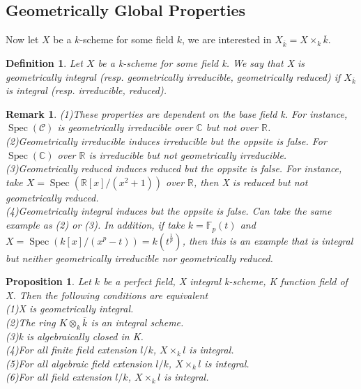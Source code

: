 \documentclass{ctexart}
\newtheorem{definition}{Definition}[section]
\newtheorem{remark}{Remark}[section]
\newtheorem{proposition}{Proposition}[section]
\newcommand{\spec}{\operatorname{Spec}}
\begin{document}
\subsection{Geometrically Global Properties}
Now let $X$ be a $k$-scheme for some field $k$, we are interested in $X_{\overline{k}} = X \times_{k} \overline{k}$.
\begin{definition}
    Let $X$ be a k-scheme for some field k.
    We say that X is geometrically integral (resp. geometrically irreducible, geometrically reduced) if $X_{\overline{k}}$ is integral (resp. irreducible, reduced).
\end{definition}
\begin{remark}
    (1)These properties are dependent on the base field k.
    For instance, $\spec(\mathcal{C})$ is geometrically irreducible over $\mathbb{C}$ but not over $\mathbb{R}$. \\
    (2)Geometrically irreducible induces irreducible but the oppsite is false.
    For $\spec(\mathbb{C})$ over $\mathbb{R}$ is irreducible but not geometrically irreducible. \\
    (3)Geometrically reduced induces reduced but the oppsite is false.
    For instance, take $X = \spec(\mathbb{R}[x]/(x^{2} + 1))$ over $\mathbb{R}$, then X is reduced but not geometrically reduced. \\
    (4)Geometrically integral induces but the oppsite is false.
    Can take the same example as (2) or (3).
    In addition, if take $k = \mathbb{F}_{p}(t)$ and $X = \spec(k[x]/(x^{p} - t)) = k(t^{\frac{1}{p}})$, 
    then this is an example that is integral but neither geometrically irreducible nor geometrically reduced.
\end{remark}
\begin{proposition}
    Let $k$ be a perfect field, X integral k-scheme, K function field of X.
    Then the following conditions are equivalent \\
    (1)X is geometrically integral. \\
    (2)The ring $K \otimes_{k} \overline{k}$ is an integral scheme. \\
    (3)k is algebraically closed in K. \\
    (4)For all finite field extension $l/k$, $X \times_{k} l$ is integral. \\
    (5)For all algebraic field extension $l/k$, $X \times_{k} l$ is integral. \\
    (6)For all field extension $l/k$, $X \times_{k} l$ is integral.
    \label{Proposition 3.11}
\end{proposition}
\end{document}

